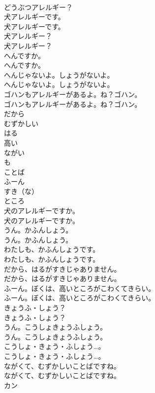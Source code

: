 \documentclass[8pt]{extreport}
\begin{document}
\begin{CJK}{UTF8}{min}
\\	どうぶつアレルギー？ 
\\	犬アレルギーです。	
\\	犬アレルギーです。 
\\	犬アレルギー？	
\\	犬アレルギー？ 
\\	へんですか。	
\\	へんですか。 
\\	へんじゃないよ。しょうがないよ。	
\\	へんじゃないよ。しょうがないよ。 
\\	ゴハンもアレルギーがあるよ。ね？ゴハン。	
\\	ゴハンもアレルギーがあるよ。ね？ゴハン。 
\\	だから
\\	むずかしい
\\	はる
\\	高い
\\	ながい
\\	も
\\	ことば
\\	ふーん
\\	すき（な）
\\	ところ
\\	犬のアレルギーですか。	
\\	犬のアレルギーですか。 
\\	うん。かふんしょう。	
\\	うん。かふんしょう。 
\\	わたしも、かふんしょうです。	
\\	わたしも、かふんしょうです。 
\\	だから、はるがすきじゃありません。	
\\	だから、はるがすきじゃありません。 
\\	ふーん。ぼくは、高いところがこわくてきらい。	
\\	ふーん。ぼくは、高いところがこわくてきらい。 
\\	きょうふ・しょう？	
\\	きょうふ・しょう？ 
\\	うん。こうしょきょうふしょう。	
\\	うん。こうしょきょうふしょう。 
\\	こうしょ・きょう・ふしょう…。	
\\	こうしょ・きょう・ふしょう…。 
\\	ながくて、むずかしいことばですね。
\\	ながくて、むずかしいことばですね。
\\	カン

\end{CJK}
\end{document}
